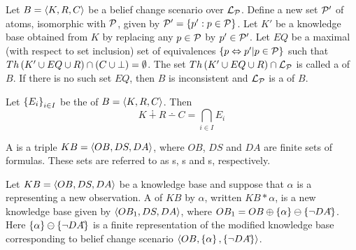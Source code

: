 \begin{defi}
Let $B=\left\langle K,R,C\right\rangle$ be a belief change scenario over $\mathcal{L}_{\mathcal{P}}$. Define a new set $\mathcal{P}'$ of atoms, isomorphic with $\mathcal{P}$, given by $\mathcal{P}'=\left\{ p':p\in\mathcal{P}\right\}$. Let $K'$ be a knowledge base obtained from $K$ by replacing any $p\in\mathcal{P}$ by $p'\in\mathcal{P}'$. Let $EQ$ be a maximal (with respect to set inclusion) set of equivalences $\left\{ p\Leftrightarrow p'|p\in\mathcal{P}\right\}$ such that $Th\left(K'\cup EQ\cup R\right)\cap\left( C\cup\bot\right)=\emptyset$. The set $Th\left(K'\cup EQ\cup R\right)\cap\mathcal{L}_{\mathcal{P}}$ is called a  of $B$. If there is no such set $EQ$, then $B$ is inconsistent and $\mathcal{L}_{\mathcal{P}}$ is a  of $B$.
\cite{conf/fedcsis/KorpusikLM12}
\end{defi}

\begin{defi}
Let $\left\{ E_i\right\}_{i\in I}$ be the  of $B=\left\langle K,R,C\right\rangle$. Then
\begin{equation}
K\dotplus R\dotminus C=\displaystyle\bigcap_{i\in I}E_i
\end{equation}
\cite{conf/fedcsis/KorpusikLM12}
\end{defi}

\begin{defi}
A  is a triple $KB=\left\langle OB,DS,DA\right\rangle$, where $OB$, $DS$ and $DA$ are finite sets of formulas. These sets are referred to as s, s and s, respectively.
\cite{conf/fedcsis/KorpusikLM12}
\end{defi}

\begin{defi}
Let $KB=\left\langle OB,DS,DA\right\rangle$ be a knowledge base and suppose that $\alpha$ is a  representing a new observation. A  of $KB$ by $\alpha$, written $KB\ast\alpha$, is a new knowledge base given by $\left\langle OB_1,DS,DA\right\rangle$, where $OB_1=OB\oplus\left\{ \alpha\right\}\ominus\left\{ \neg DA\hat{}\right\}$. Here $\left\{ \alpha\right\}\ominus\left\{ \neg DA\hat{}\right\}$ is a finite representation of the modified knowledge base corresponding to belief change scenario $\left\langle OB,\left\{ \alpha\right\},\left\{ \neg DA\hat{}\right\}\right\rangle$.
\cite{conf/fedcsis/KorpusikLM12}
\end{defi}

